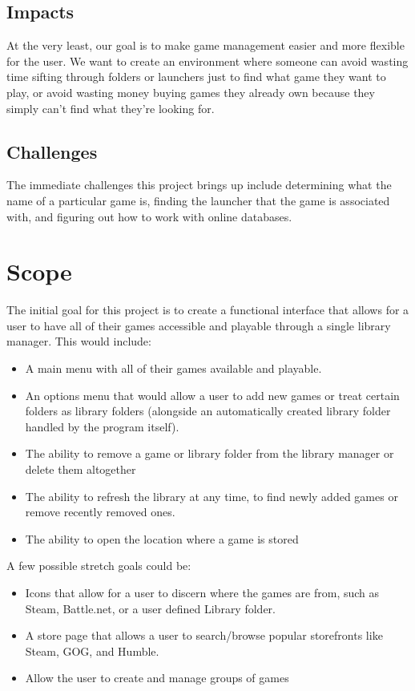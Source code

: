 \documentclass[10pt,conference,onecolumn,compsoc]{IEEEtran}
\begin{document}
\subsection{Impacts}
At the very least, our goal is to make game management easier and more flexible for the user. We want to create an environment where someone can avoid wasting time sifting through folders or launchers just to find what game they want to play, or avoid wasting money buying games they already own because they simply can't find what they're looking for.

\subsection{Challenges}
The immediate challenges this project brings up include determining what the name of a particular game is, finding the launcher that the game is associated with, and figuring out how to work with online databases.

\section{Scope}
The initial goal for this project is to create a functional interface that allows for a user to have all of their games accessible and playable through a single library manager. This would include:

\begin{itemize}
\item A main menu with all of their games available and playable.
\item An options menu that would allow a user to add new games or treat certain folders as library folders (alongside an automatically created library folder handled by the program itself).
\item The ability to remove a game or library folder from the library manager or delete them altogether
\item The ability to refresh the library at any time, to find newly added games or remove recently removed ones.
\item The ability to open the location where a game is stored
\end{itemize}

A few possible stretch goals could be:

\begin{itemize}
\item Icons that allow for a user to discern where the games are from, such as Steam, Battle.net, or a user defined Library folder.
\item A store page that allows a user to search/browse popular storefronts like Steam, GOG, and Humble.
\item Allow the user to create and manage groups of games
\end{itemize}
\end{document}
